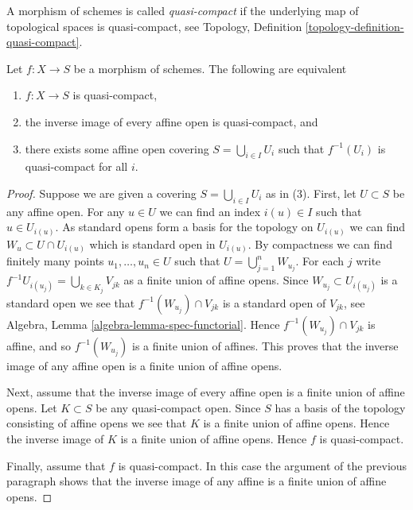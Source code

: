 \begin{definition}
\label{definition-quasi-compact}
A morphism of schemes is called {\it quasi-compact}
if the underlying map of topological spaces is
quasi-compact, see
Topology, Definition \ref{topology-definition-quasi-compact}.
\end{definition}

\begin{lemma}
\label{lemma-quasi-compact-affine}
Let $f : X \to S$ be a morphism of schemes.
The following are equivalent
\begin{enumerate}
\item $f : X \to S$ is quasi-compact,
\item the inverse image of every affine open is quasi-compact, and
\item there exists some affine open covering $S = \bigcup_{i \in I} U_i$
such that $f^{-1}(U_i)$ is quasi-compact for all $i$.
\end{enumerate}
\end{lemma}

\begin{proof}
Suppose we are given a covering $S = \bigcup_{i \in I} U_i$ as in (3).
First, let $U \subset S$ be any affine open. For any $u \in U$
we can find an index $i(u) \in I$ such that $u \in U_{i(u)}$.
As standard opens form a basis for the topology on $U_{i(u)}$ we can find
$W_u \subset U \cap U_{i(u)}$ which is standard open in $U_{i(u)}$.
By compactness we can find finitely many points $u_1, \ldots, u_n \in U$
such that $U = \bigcup_{j = 1}^n W_{u_j}$. For each $j$ write
$f^{-1}U_{i(u_j)} = \bigcup_{k \in K_j} V_{jk}$ as a finite
union of affine opens. Since $W_{u_j} \subset U_{i(u_j)}$ is a standard
open we see that $f^{-1}(W_{u_j}) \cap V_{jk}$ is a standard
open of $V_{jk}$, see Algebra, Lemma \ref{algebra-lemma-spec-functorial}.
Hence $f^{-1}(W_{u_j}) \cap V_{jk}$ is affine, and so
$f^{-1}(W_{u_j})$ is a finite union of affines. This proves that the
inverse image of any affine open is a finite union of affine opens.

\medskip\noindent
Next, assume that the inverse image of every affine open is a finite
union of affine opens.
Let $K \subset S$ be any quasi-compact open. Since $S$ has a basis
of the topology consisting of affine opens we see that $K$ is a finite
union of affine opens. Hence the inverse image of $K$ is a finite
union of affine opens. Hence $f$ is quasi-compact.

\medskip\noindent
Finally, assume that $f$ is quasi-compact. In this case the argument
of the previous paragraph shows that the inverse image of any affine
is a finite union of affine opens.
\end{proof}

